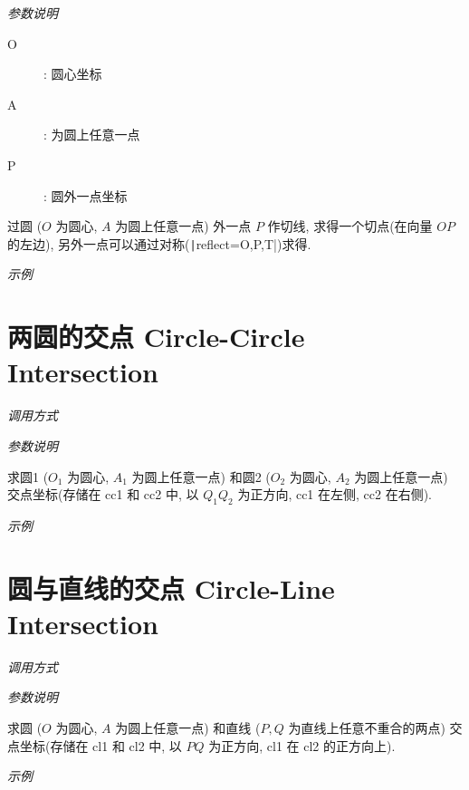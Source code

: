 \emph{参数说明}

\begin{description}
  \item[O]: 圆心坐标
  \item[A]: 为圆上任意一点
  \item[P]: 圆外一点坐标
\end{description}

过圆 ($O$ 为圆心, $A$ 为圆上任意一点) 外一点 $P$ 作切线, 求得一个切点(在向量 $OP$ 的左边),
另外一点可以通过对称(\texttt|reflect={O,P,T}|)求得.

\emph{示例}


\section{两圆的交点 Circle-Circle Intersection}

\emph{调用方式}

\begin{tcolorbox}{}
\end{tcolorbox}

\emph{参数说明}

求圆1 ($O_1$ 为圆心, $A_1$ 为圆上任意一点)
和圆2 ($O_2$ 为圆心, $A_2$ 为圆上任意一点) 
交点坐标(存储在 cc1 和 cc2 中, 以 $Q_1Q_2$ 为正方向, cc1 在左侧, cc2 在右侧).

\emph{示例}


\section{圆与直线的交点 Circle-Line Intersection}

\emph{调用方式}

\begin{tcolorbox}{}
\end{tcolorbox}

\emph{参数说明}

求圆 ($O$ 为圆心, $A$ 为圆上任意一点)
和直线 ($P,Q$ 为直线上任意不重合的两点) 
交点坐标(存储在 cl1 和 cl2 中, 以 $PQ$ 为正方向, cl1 在 cl2 的正方向上).

\emph{示例}


